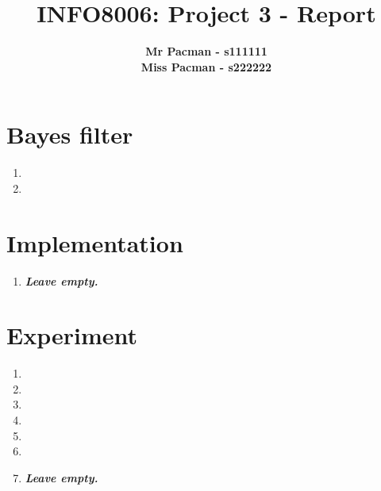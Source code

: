 \documentclass{article}
\begin{document}

\title{\Large{INFO8006: Project 3 - Report}}
\vspace{1cm}
\author{\small{\bf Mr Pacman - s111111} \\ \small{\bf Miss Pacman - s222222}}

\maketitle


\section{Bayes filter}

\begin{enumerate}[label=\alph*.,leftmargin=*]
    \item
    \item
\end{enumerate}

\section{Implementation}

\begin{enumerate}[label=\alph*.,leftmargin=*]
    \item \textbf{\textit{Leave empty.}}
\end{enumerate}

\section{Experiment}

\begin{enumerate}[label=\alph*.,leftmargin=*]
    \item
    \item
    \item
    \item
    \item
    \item
    \item \textbf{\textit{Leave empty.}}
\end{enumerate}

\end{document}
